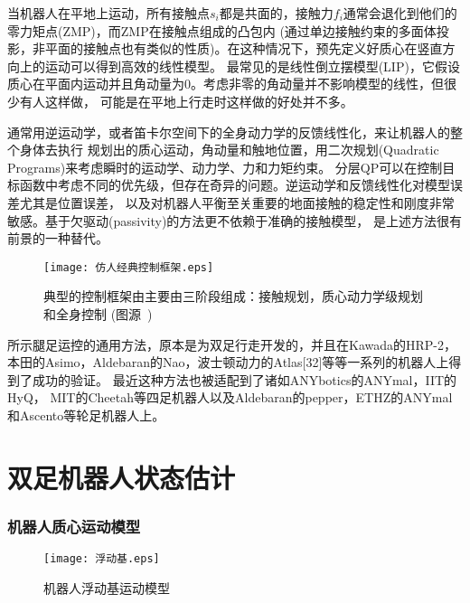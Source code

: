 当机器人在平地上运动，所有接触点$s_i$都是共面的，接触力$f_i$通常会退化到他们的零力矩点(ZMP)，而ZMP在接触点组成的凸包内\cite{wieber2002stability}
(通过单边接触约束的多面体投影，非平面的接触点也有类似的性质\cite{caron2016zmp})。在这种情况下，预先定义好质心在竖直方向上的运动可以得到高效的线性模型。
最常见的是线性倒立摆模型(LIP)，它假设质心在平面内运动并且角动量为0\cite{kajita1991study}。考虑非零的角动量并不影响模型的线性，但很少有人这样做，
可能是在平地上行走时这样做的好处并不多\cite{koolen2012capturability}。

通常用逆运动学\cite{kajita2003resolved}，或者笛卡尔空间下的全身动力学的反馈线性化\cite{wieber2000constrained}，来让机器人的整个身体去执行
规划出的质心运动，角动量和触地位置，用二次规划(Quadratic Programs)来考虑瞬时的运动学、动力学、力和力矩约束\cite{wieber2000constrained, kuindersma2014efficiently}。
分层QP可以在控制目标函数中考虑不同的优先级\cite{escande2014hierarchical}，但存在奇异的问题\cite{wieber2017geometric}。逆运动学和反馈线性化对模型误差尤其是位置误差，
以及对机器人平衡至关重要的地面接触的稳定性和刚度非常敏感。基于欠驱动(passivity)的方法更不依赖于准确的接触模型\cite{henze2016passivity, kurtz2020approximate}，
是上述方法很有前景的一种替代。
\begin{figure}[htbp]
    \centering
    \texttt{[image: 仿人经典控制框架.eps]}
    \caption{\label{fig:typical_control}典型的控制框架由主要由三阶段组成：接触规划，质心动力学级规划和全身控制
                (图源~\cite{carpentier2016center})}
\end{figure}
所示腿足运控的通用方法，原本是为双足行走开发的，并且在Kawada的HRP-2\cite{takenaka2009real}，
本田的Asimo\cite{takenaka2009real}，Aldebaran的Nao\cite{gouaillier2010omni}，波士顿动力的Atlas[32]等等一系列的机器人上得到了成功的验证。
最近这种方法也被适配到了诸如ANYbotics的ANYmal\cite{bellicoso2018dynamic}，IIT的HyQ\cite{mastalli2017trajectory}，
MIT的Cheetah\cite{di2018dynamic}等四足机器人以及Aldebaran的pepper\cite{lafaye2014linear}，ETHZ的ANYmal\cite{bjelonic2020rolling}
和Ascento\cite{klemm2020lqr}等轮足机器人上。

\chapter{双足机器人状态估计}
\subsection{机器人质心运动模型}
\begin{figure}[htbp]
    \centering
    \texttt{[image: 浮动基.eps]}
    \caption{\label{fig:zju-logo}机器人浮动基运动模型}
\end{figure}

